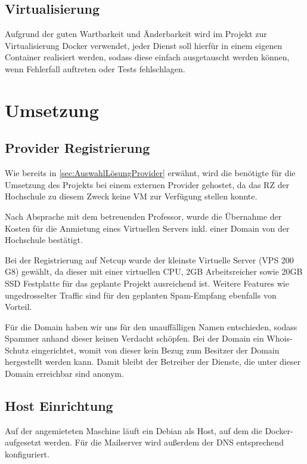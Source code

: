 \documentclass[a4paper,11pt,singlespacing]{article}
\begin{document}
		
	\subsection{Virtualisierung}\label{sec:AuswahlLösungVirtualisierung}
		Aufgrund der guten Wartbarkeit und Änderbarkeit wird im Projekt zur Virtualisierung Docker verwendet, jeder Dienst soll hierfür in einem eigenen Container realisiert werden, sodass diese einfach ausgetauscht werden können, wenn Fehlerfall auftreten oder Tests fehlschlagen.

\newpage


\section{Umsetzung}\label{sec:Umsetzung}
	
	\subsection{Provider Registrierung}\label{sec:ProviderRegistrierung} 
		Wie bereits in \autoref{sec:AuswahlLösungProvider} erwähnt, wird die benötigte  für die Umsetzung des Projekts bei einem externen Provider gehostet, da das RZ der Hochschule zu diesem Zweck keine VM zur Verfügung stellen konnte.
		
		Nach Absprache mit dem betreuenden Professor, wurde die Übernahme der Kosten für die Anmietung eines Virtuellen Servers inkl. einer Domain von der Hochschule bestätigt.  
		
		Bei der Registrierung auf \textsf{Netcup} wurde der kleinste Virtuelle Server (VPS 200 G8) gewählt, da dieser mit einer virtuellen CPU, 2GB Arbeitsreicher sowie 20GB SSD Festplatte für das geplante Projekt ausreichend ist. Weitere Features wie ungedrosselter Traffic sind für den geplanten Spam-Empfang ebenfalls von Vorteil.
		
		Für die Domain haben wir uns für den unauffälligen Namen entschieden, sodass Spammer anhand dieser keinen Verdacht schöpfen. Bei der Domain ein Whois-Schutz eingerichtet, womit von dieser kein Bezug zum Besitzer der Domain hergestellt werden kann. Damit bleibt der Betreiber der Dienste, die unter dieser Domain erreichbar sind anonym.
		
		
	\subsection{Host Einrichtung}\label{sec:UmsetzungHostEinrichtung}
		Auf der angemieteten Maschine läuft ein Debian als Host, auf dem die Docker- aufgesetzt werden. Für die Mailserver wird außerdem der DNS entsprechend konfiguriert.
		
\end{document}
